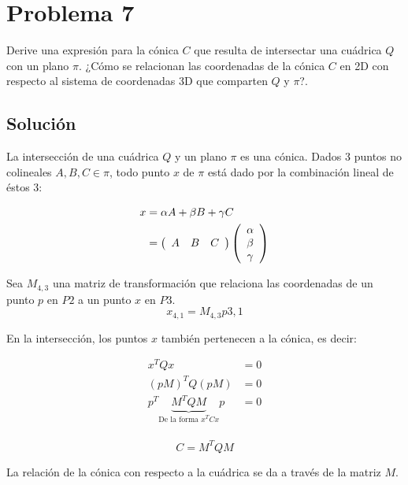 \section*{Problema 7}
\setcounter{equation}{0}
Derive una expresión para la cónica $C$ que resulta de intersectar una cuádrica
$Q$ con un plano $\pi$. ¿Cómo se relacionan las coordenadas de la cónica $C$ en 2D con
respecto al sistema de coordenadas 3D que comparten $Q$ y $\pi$?.

\subsection*{Solución}
La intersección de una cuádrica $Q$ y un plano $\pi$ es una cónica. Dados 3 puntos
no colineales $A,B,C \in \pi$, todo punto $x$ de $\pi$ está dado por la combinación lineal de
éstos 3:

\begin{align*}
x &= \alpha A + \beta B + \gamma C \\
  &= 
\left(
\begin{array}{c c c}
  A & B & C
\end{array}
\right) 
\left(
\begin{array}{c}
    \alpha \\ 
    \beta \\ 
    \gamma
\end{array}
\right) 
\end{align*} 

Sea $M_{4,3}$ una matriz de transformación que relaciona las coordenadas de un 
punto $p$ en $P2$ a un punto $x$ en $P3$.
\begin{equation*}
x_{4,1} = M_{4,3} p{3,1}
\end{equation*} 

En la intersección, los puntos $x$ también pertenecen a la cónica, es decir:

\begin{align*}
x^T Q x &= 0 \\
(p M)^T Q (p M) &= 0 \\
p^T \underbrace{M^T Q M}_\text{De la forma $x^T C x$} p &= 0\\
\end{align*} 

\begin{equation*}
C = M^T Q M
\end{equation*}

 La relación de la cónica con respecto a la cuádrica se da a través de la matriz $M$.

